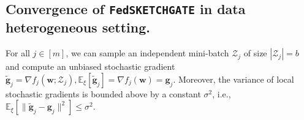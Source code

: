 \subsection{Convergence of  \texttt{FedSKETCHGATE} in data heterogeneous setting.} 
\begin{assumption}\label{Assu:2}
For all $j\in [m]$, we can sample an independent mini-batch $\mathcal{Z}_j$   of size $|\mathcal{Z}_j| = b$ and compute an unbiased stochastic gradient $\tilde{\mathbf{g}}_j = \nabla f_j(\boldsymbol{w}; \mathcal{Z}_j), \mathbb{E}_{\xi}[\tilde{\mathbf{g}}_j] = \nabla f_{j}(\boldsymbol{w})={\mathbf{g}}_j$. Moreover, the variance of local stochastic gradients is bounded above by a constant $\sigma^2$, i.e., $
\mathbb{E}_{\xi}\left[\|\tilde{\mathbf{g}}_j-{\mathbf{g}}_j\|^2\right]\leq \sigma^2$.
\end{assumption}

